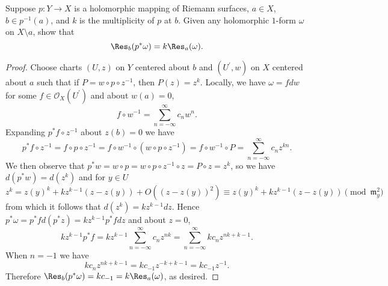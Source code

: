 \documentclass[10pt]{amsart}
\begin{document}
\begin{thm}
  Suppose $p \colon Y \rightarrow X$ is a holomorphic mapping of Riemann surfaces, $a \in X$, $b \in p^{-1}(a)$, and $k$ is the multiplicity of $p$ at $b$.
  Given any holomorphic $1$-form $\omega$ on $X \setminus{a}$, show that 
  $$\Res_b(p^*\omega) = k\Res_a(\omega).$$
  
  \begin{proof}
    Choose charts $(U,z)$ on $Y$ centered about $b$ and $(U^\prime, w)$ on $X$ centered about $a$ such that if $P = w \circ p \circ z^{-1}$, then $P(z) = z^k$.
    Locally, we have $\omega = fdw$ for some $f \in \mathcal{O}_X(U^\prime)$ and about $w(a) = 0$,
    $$f \circ w^{-1} = \sum_{n = -\infty}^\infty c_n w^n.$$
    Expanding $p^*f \circ z^{-1}$ about $z(b) = 0$ we have
    $$p^*f \circ z^{-1} = f \circ p \circ z^{-1} = f \circ w^{-1} \circ (w \circ p \circ z^{-1}) = f \circ w^{-1} \circ P = \sum_{n = -\infty}^\infty c_n z^{kn}.$$
    We then observe that $p^*w = w \circ p = w \circ p \circ z^{-1} \circ z = P \circ z = z^{k}$, so we have $d(p^*w) = d(z^k)$ and for $y \in U$
    $$z^k = z(y)^k + kz^{k-1}(z - z(y)) + O((z - z(y))^2) \equiv z(y)^k + kz^{k-1}(z - z(y)) \pmod{\mathfrak{m}_y^2}$$
    from which it follows that $d(z^k) = kz^{k-1}dz$.
    Hence $p^*\omega = p^*f d (p^*z) = kz^{k-1}p^*fdz$ and about $z = 0$, 
    $$kz^{k-1}p^*f = kz^{k-1}\sum_{n = -\infty}^\infty c_n z^{nk} = \sum_{n = -\infty}^\infty kc_n z^{nk + k - 1}.$$
    When $n = -1$ we have 
    $$kc_nz^{nk + k - 1} = kc_{-1}z^{-k + k - 1} = kc_{- 1}z^{-1}.$$
    Therefore $\Res_b(p^*\omega) = kc_{-1} = k\Res_a(\omega)$, as desired.
  \end{proof}
\end{thm}
\end{document}
